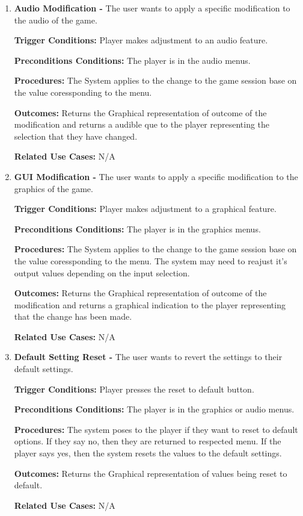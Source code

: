 \documentclass{article}
\begin{document}
\begin{enumerate}[{PUC}1. ]
	\item \textbf{Audio Modification -} The user wants to apply a specific modification to the audio of the game.\par
\textbf{Trigger Conditions: }Player makes adjustment to an audio feature. \par
\textbf{Preconditions Conditions: }The player is in the audio menus. \par
\textbf{Procedures: }The System applies to the change to the game session base on the value coressponding to the menu. \par
\textbf{Outcomes: }Returns the Graphical representation of outcome of the modification and returns a audible que to the player representing the selection that they have changed. \par
\textbf{Related Use Cases: }N/A \par

	\item \textbf{GUI Modification -} The user wants to apply a specific modification to the graphics of the game.\par
\textbf{Trigger Conditions: }Player makes adjustment to a graphical feature. \par
\textbf{Preconditions Conditions: }The player is in the graphics menus. \par
\textbf{Procedures: }The System applies to the change to the game session base on the value coressponding to the menu. The system may need to reajust it's output values depending on the input selection. \par
\textbf{Outcomes: }Returns the Graphical representation of outcome of the modification and returns a graphical indication to the player representing that the change has been made. \par
\textbf{Related Use Cases: }N/A \par

	\item \textbf{Default Setting Reset -} The user wants to revert the settings to their default settings.\par
\textbf{Trigger Conditions: }Player presses the reset to default button. \par
\textbf{Preconditions Conditions: }The player is in the graphics or audio menus. \par
\textbf{Procedures: }The system poses to the player if they want to reset to default options. If they say no, then they are returned to respected menu. If the player says yes, then the system resets the values to the default settings. \par
\textbf{Outcomes: }Returns the Graphical representation of values being reset to default. \par
\textbf{Related Use Cases: }N/A \par
\end{enumerate}
\end{document}
